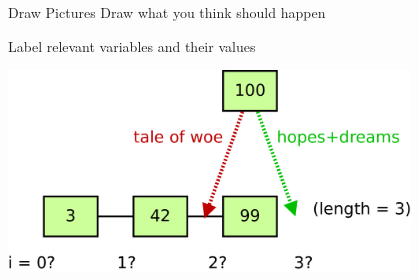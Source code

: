 \documentclass[xcolor=dvipsnames]{beamer}
\begin{document}
\begin{frame}{Draw Pictures}
	Draw what you think should happen

	Label relevant variables and their values
	\linegap

	\begin{center}
		\includegraphics[width=0.8\textwidth]{draw-a-picture.png}
	\end{center}
\end{frame}
\end{document}
